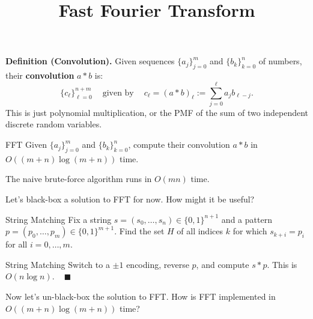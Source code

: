 \title{Fast Fourier Transform}



\textbf{Definition (Convolution).} Given sequences $\{a_j\}_{j = 0}^m$ and $\{b_k\}_{k = 0}^n$ of numbers, their \textbf{convolution} $a \ast b$ is:
\[ \{c_\ell\}_{\ell = 0}^{n + m} ~~~~ \text{ given by } ~~~~ c_{\ell} = (a \ast b)_{\ell} := \sum_{j = 0}^{\ell} a_j b_{\ell - j}.\]
This is just polynomial multiplication, or the PMF of the sum of two independent discrete random variables.

\begin{problem}{FFT}
    Given $\{a_j\}_{j = 0}^m$ and $\{b_k\}_{k = 0}^n$, compute their convolution $a \ast b$ in $O((m + n) \log (m + n))$ time.
\end{problem}

\begin{remark}
    The naive brute-force algorithm runs in $O(mn)$ time.
\end{remark}

Let's black-box a solution to FFT for now.  How might it be useful?

\begin{problem}{String Matching}
    Fix a string $s = (s_0, \dots, s_n) \in \{0, 1\}^{n + 1}$ and a pattern $p = (p_0, \dots, p_m) \in \{0, 1\}^{m + 1}$.  Find the set $H$ of all indices $k$ for which $s_{k + i} = p_i$ for all $i = 0, \dots, m$.
\end{problem}

\begin{solution}{String Matching}
    Switch to a $\pm 1$ encoding, reverse $p$, and compute $s \ast p$.  This is $O(n \log n)$. ~ $\blacksquare$
\end{solution}

Now let's un-black-box the solution to FFT.  How is FFT implemented in $O((m + n) \log (m + n))$ time?

